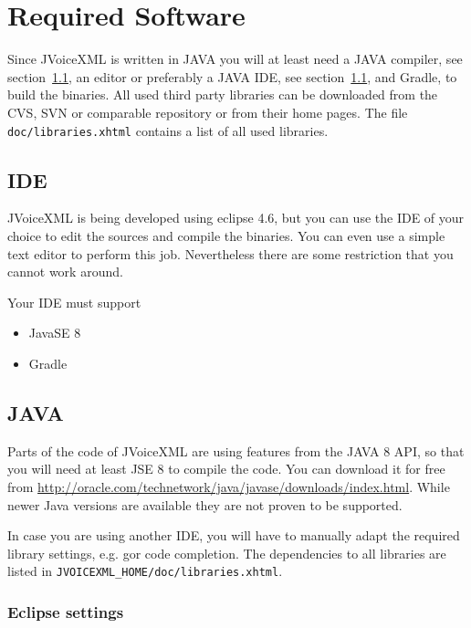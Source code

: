 \documentclass[11pt,a4paper]{article}
\begin{document}
\section{Required Software}
\label{sec:required-software}

Since JVoiceXML is written in JAVA you will at least need a
JAVA compiler, see section~\ref{sec:ide}, an editor or preferably a JAVA
IDE, see section~\ref{sec:ide}, and Gradle, to build the
binaries. All used third party libraries can be downloaded from the CVS, SVN or
comparable repository or from their home pages. The file
\texttt{doc/libraries.xhtml} contains a list of all used libraries.


\subsection{IDE}
\label{sec:ide}

JVoiceXML is being developed using eclipse 4.6, but you can use the IDE of your
choice to edit the sources and compile the binaries. You can even use a simple
text editor to perform this job. Nevertheless there are some restriction that
you cannot work around.

Your IDE must support

\begin{itemize}
\item JavaSE 8
\item Gradle
\end{itemize}

\subsection{JAVA}
\label{sec:java}

Parts of the code of JVoiceXML are using features from the JAVA 8 API, so that
you will need at least JSE 8 to compile the code. You can download it
for free from \url{http://oracle.com/technetwork/java/javase/downloads/index.html}.
While newer Java versions are available they are not proven to be supported.

In case you are using another IDE, you will have to manually adapt
the required library settings, e.g. gor code completion. The dependencies to all
libraries are listed in \lstinline{JVOICEXML_HOME/doc/libraries.xhtml}.


\subsubsection{Eclipse settings}
\label{sec:eclipse}
\end{document}

